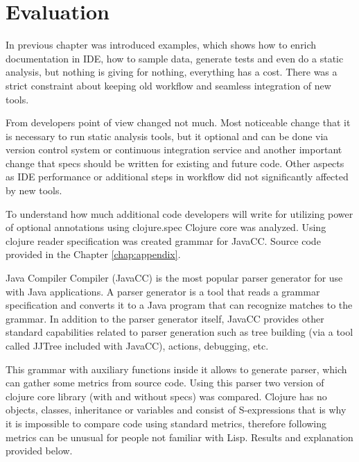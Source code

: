 \chapter{Evaluation}

\label{chap:evaluation}

In previous chapter was introduced examples, which shows how to enrich
documentation in IDE, how to sample data, generate tests and even do a static
analysis, but nothing is giving for nothing, everything has a cost. There was a
strict constraint about keeping old workflow and seamless integration of new
tools.

From developers point of view changed not much. Most noticeable change that it
is necessary to run static analysis tools, but it optional and can be done via
version control system or continuous integration service and another important
change that specs should be written for existing and future code. Other aspects
as IDE performance or additional steps in workflow did not significantly affected
by new tools.

To understand how much additional code developers will write for utilizing power
of optional annotations using clojure.spec Clojure core was analyzed. Using
clojure reader specification \cite{readerspec} was created grammar for JavaCC.
Source code provided in the Chapter \ref{chap:appendix}.


Java Compiler Compiler (JavaCC) is the most popular parser generator for use
with Java applications. A parser generator is a tool that reads a grammar
specification and converts it to a Java program that can recognize matches to
the grammar. In addition to the parser generator itself, JavaCC provides other
standard capabilities related to parser generation such as tree building (via a
tool called JJTree included with JavaCC), actions, debugging, etc.

This grammar with auxiliary functions inside it allows to generate parser, which
can gather some metrics from source code. Using this parser two version of
clojure core library (with and without specs) was compared. Clojure has no
objects, classes, inheritance or variables and consist of S-expressions that is
why it is impossible to compare code using standard metrics, therefore following
metrics can be unusual for people not familiar with Lisp. Results and
explanation provided below.

